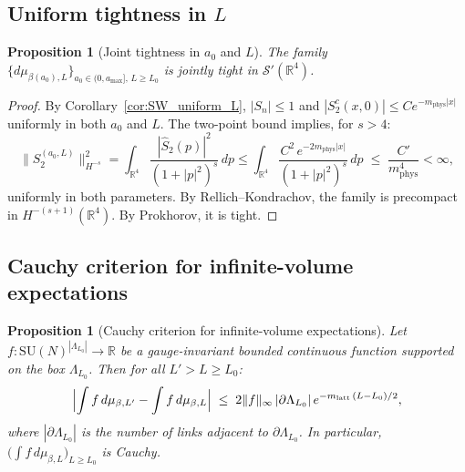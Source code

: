 \documentclass[11pt,a4paper]{amsart}
\newtheorem{proposition}[theorem]{Proposition}
\theoremstyle{definition}
\newcommand{\SU}{\mathrm{SU}}
\newcommand{\R}{\mathbb{R}}
\begin{document}
\subsection{Uniform tightness in $L$}
\label{sec:infvol_tightness}

\begin{proposition}[Joint tightness in $a_0$ and $L$]
\label{prop:joint_tightness}
The family
$\bigl\{d\mu_{\beta(a_0),L}\bigr\}_{a_0\in(0,a_{\max}],\,L\ge L_0}$
is jointly tight in $\mathcal{S}'(\R^4)$.
\end{proposition}

\begin{proof}
By Corollary~\ref{cor:SW_uniform_L}, $|S_n|\le 1$ and
$|S_2^c(x,0)|\le Ce^{-m_{\mathrm{phys}}|x|}$ uniformly in both $a_0$ and $L$.
The two-point bound implies, for $s > 4$:
\[
  \|S_2^{(a_0,L)}\|_{H^{-s}}^2
  = \int_{\R^4} \frac{|\hat{S}_2(p)|^2}{(1+|p|^2)^s}\,dp
  \le \int_{\R^4} \frac{C^2\,e^{-2m_{\mathrm{phys}}|x|}}{(1+|p|^2)^s}\,dp
  \;\le\; \frac{C'}{m_{\mathrm{phys}}^{4}} < \infty,
\]
uniformly in both parameters.  By Rellich--Kondrachov, the family is precompact
in $H^{-(s+1)}(\R^4)$.  By Prokhorov, it is tight.
\end{proof}

\subsection{Cauchy criterion for infinite-volume expectations}
\label{sec:infvol_projective}

\begin{proposition}[Cauchy criterion for infinite-volume expectations]
\label{prop:projective}
Let $f\colon \SU(N)^{|\Lambda_{L_0}|}\to\R$ be a gauge-invariant bounded continuous
function supported on the box $\Lambda_{L_0}$.  Then for all $L' > L \ge L_0$:
\begin{equation}
\label{eq:cauchy_iv}
  \Bigl|\int f\,d\mu_{\beta,L'}
  - \int f\,d\mu_{\beta,L}\Bigr|
  \;\le\; 2\|f\|_\infty\,|\partial\Lambda_{L_0}|\,e^{-m_{\mathrm{latt}}\,(L-L_0)/2},
\end{equation}
where $|\partial\Lambda_{L_0}|$ is the number of links adjacent to $\partial\Lambda_{L_0}$.
In particular, $\bigl(\int f\,d\mu_{\beta,L}\bigr)_{L\ge L_0}$ is Cauchy.
\end{proposition}
\end{document}
